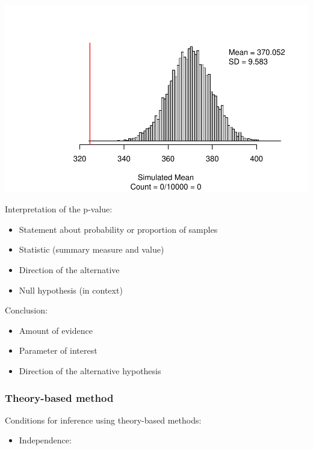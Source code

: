 \documentclass[
]{report}
\providecommand{\tightlist}{%
  \setlength{\itemsep}{0pt}\setlength{\parskip}{0pt}}
\begin{document}
\begin{center}\includegraphics[width=0.6\linewidth]{06-VN06-EDAonemeanSim_files/figure-latex/unnamed-chunk-14-1} \end{center}

\newpage

Interpretation of the p-value:

\begin{itemize}
\item
  Statement about probability or proportion of samples
\item
  Statistic (summary measure and value)
\item
  Direction of the alternative
\item
  Null hypothesis (in context)
\end{itemize}

\vspace{0.8in}

Conclusion:

\begin{itemize}
\item
  Amount of evidence
\item
  Parameter of interest
\item
  Direction of the alternative hypothesis
\end{itemize}

\vspace{0.8in}

\subsubsection*{Theory-based method}\label{theory-based-method}

Conditions for inference using theory-based methods:

\begin{itemize}
\tightlist
\item
  Independence:
\end{itemize}
\end{document}
